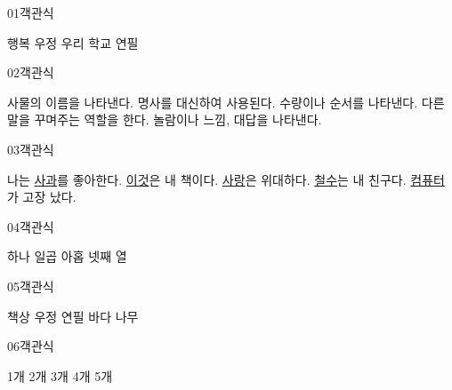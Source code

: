 \documentclass[fs85,seriesRus]{korfarm-base}
\begin{document}

\par\medskip
\kfBeginMC
\begin{kfQBlock}{01}{객관식}
\begin{kfChoices}
\kfChoice 행복
\kfChoice 우정
\kfChoice 우리
\kfChoice 학교
\kfChoice 연필
\end{kfChoices}
\end{kfQBlock}
\begin{kfQBlock}{02}{객관식}
\begin{kfChoices}
\kfChoice 사물의 이름을 나타낸다.
\kfChoice 명사를 대신하여 사용된다.
\kfChoice 수량이나 순서를 나타낸다.
\kfChoice 다른 말을 꾸며주는 역할을 한다.
\kfChoice 놀람이나 느낌, 대답을 나타낸다.
\end{kfChoices}
\end{kfQBlock}
\begin{kfQBlock}{03}{객관식}
\begin{kfChoices}
\kfChoice 나는 \uline{사과}를 좋아한다.
\kfChoice \uline{이것}은 내 책이다.
\kfChoice \uline{사랑}은 위대하다.
\kfChoice \uline{철수}는 내 친구다.
\kfChoice \uline{컴퓨터}가 고장 났다.
\end{kfChoices}
\end{kfQBlock}
\begin{kfQBlock}{04}{객관식}
\begin{kfChoices}
\kfChoice 하나
\kfChoice 일곱
\kfChoice 아홉
\kfChoice 넷째
\kfChoice 열
\end{kfChoices}
\end{kfQBlock}
\begin{kfQBlock}{05}{객관식}
\begin{kfChoices}
\kfChoice 책상
\kfChoice 우정
\kfChoice 연필
\kfChoice 바다
\kfChoice 나무
\end{kfChoices}
\end{kfQBlock}
\begin{kfQBlock}{06}{객관식}
\begin{kfChoices}
\kfChoice 1개
\kfChoice 2개
\kfChoice 3개
\kfChoice 4개
\kfChoice 5개
\end{kfChoices}
\end{kfQBlock}
\end{document}
